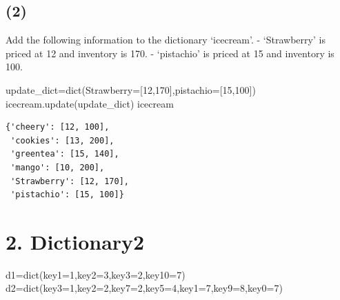 \documentclass[
  letterpaper,
  DIV=11,
  numbers=noendperiod]{scrreprt}
\newenvironment{Shaded}{\begin{snugshade}}{\end{snugshade}}
\newcommand{\BuiltInTok}[1]{\textcolor[rgb]{0.00,0.23,0.31}{#1}}
\newcommand{\DecValTok}[1]{\textcolor[rgb]{0.68,0.00,0.00}{#1}}
\newcommand{\NormalTok}[1]{\textcolor[rgb]{0.00,0.23,0.31}{#1}}
\newcommand{\OperatorTok}[1]{\textcolor[rgb]{0.37,0.37,0.37}{#1}}
\begin{document}
\subsection*{(2)}\label{section-1}

Add the following information to the dictionary `icecream'. -
`Strawberry' is priced at 12 and inventory is 170. - `pistachio' is
priced at 15 and inventory is 100.

\begin{Shaded}
\begin{Highlighting}[]
\NormalTok{update\_dict}\OperatorTok{=}\BuiltInTok{dict}\NormalTok{(Strawberry}\OperatorTok{=}\NormalTok{[}\DecValTok{12}\NormalTok{,}\DecValTok{170}\NormalTok{],pistachio}\OperatorTok{=}\NormalTok{[}\DecValTok{15}\NormalTok{,}\DecValTok{100}\NormalTok{])}
\NormalTok{icecream.update(update\_dict)}
\NormalTok{icecream}
\end{Highlighting}
\end{Shaded}

\begin{verbatim}
{'cheery': [12, 100],
 'cookies': [13, 200],
 'greentea': [15, 140],
 'mango': [10, 200],
 'Strawberry': [12, 170],
 'pistachio': [15, 100]}
\end{verbatim}

\section*{2. Dictionary2}\label{dictionary2}


\begin{Shaded}
\begin{Highlighting}[]
\NormalTok{d1}\OperatorTok{=}\BuiltInTok{dict}\NormalTok{(key1}\OperatorTok{=}\DecValTok{1}\NormalTok{,key2}\OperatorTok{=}\DecValTok{3}\NormalTok{,key3}\OperatorTok{=}\DecValTok{2}\NormalTok{,key10}\OperatorTok{=}\DecValTok{7}\NormalTok{)}
\NormalTok{d2}\OperatorTok{=}\BuiltInTok{dict}\NormalTok{(key3}\OperatorTok{=}\DecValTok{1}\NormalTok{,key2}\OperatorTok{=}\DecValTok{2}\NormalTok{,key7}\OperatorTok{=}\DecValTok{2}\NormalTok{,key5}\OperatorTok{=}\DecValTok{4}\NormalTok{,key1}\OperatorTok{=}\DecValTok{7}\NormalTok{,key9}\OperatorTok{=}\DecValTok{8}\NormalTok{,key0}\OperatorTok{=}\DecValTok{7}\NormalTok{)}
\end{Highlighting}
\end{Shaded}
\end{document}
